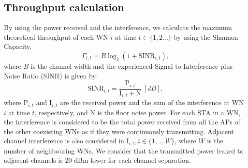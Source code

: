 \documentclass[conference]{IEEEtran}
\begin{document}
	\subsection{Throughput calculation}
	\label{section:throughput_calculation}
	
	By using the power received and the interference, we calculate the maximum theoretical throughput of each WN $i$ at time $t \in \{1,2 ...\}$ by using the Shannon Capacity.
	\begin{equation}
	\Gamma_{i,t} = B  \log_{2}(1 + \text{SINR}_{i, t}),
	\nonumber
	\label{eq:shannon_capacity}
	\end{equation}
	where $B$ is the channel width and the experienced Signal to Interference plus Noise Ratio (SINR) is given by:
	\begin{equation}
	\text{SINR}_{i,t} = \frac{\text{P}_{i,t}}{\text{I}_{i,t}+\text{N}} \: [dB],
	\label{eq:sinr}
	\end{equation}
	where $\text{P}_{i,t}$ and $\text{I}_{i,t}$ are the received power and the sum of the interference at WN $i$ at time $t$, respectively, and N is the floor noise power. For each STA in a WN, the interference is considered to be the total power received from all the APs of the other coexisting WNs as if they were continuously transmitting. Adjacent channel interference is also considered in $\text{I}_{i,t}, i \in \{1,..,W\}$, where $W$ is the number of neighbouring WNs. We consider that the transmitted power leaked to adjacent channels is $20$ dBm lower for each channel separation.	
	
\end{document}
